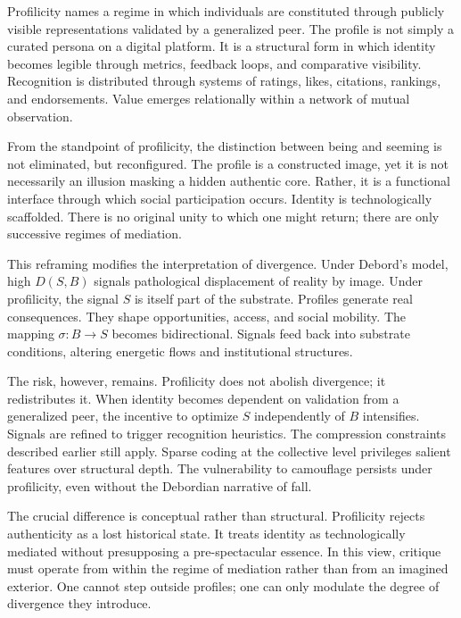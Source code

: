 \documentclass[11pt]{article}
\begin{document}
Profilicity names a regime in which individuals are constituted through publicly visible representations validated by a generalized peer. The profile is not simply a curated persona on a digital platform. It is a structural form in which identity becomes legible through metrics, feedback loops, and comparative visibility. Recognition is distributed through systems of ratings, likes, citations, rankings, and endorsements. Value emerges relationally within a network of mutual observation.

From the standpoint of profilicity, the distinction between being and seeming is not eliminated, but reconfigured. The profile is a constructed image, yet it is not necessarily an illusion masking a hidden authentic core. Rather, it is a functional interface through which social participation occurs. Identity is technologically scaffolded. There is no original unity to which one might return; there are only successive regimes of mediation.

This reframing modifies the interpretation of divergence. Under Debord's model, high $D(S,B)$ signals pathological displacement of reality by image. Under profilicity, the signal $S$ is itself part of the substrate. Profiles generate real consequences. They shape opportunities, access, and social mobility. The mapping $\sigma : B \to S$ becomes bidirectional. Signals feed back into substrate conditions, altering energetic flows and institutional structures.

The risk, however, remains. Profilicity does not abolish divergence; it redistributes it. When identity becomes dependent on validation from a generalized peer, the incentive to optimize $S$ independently of $B$ intensifies. Signals are refined to trigger recognition heuristics. The compression constraints described earlier still apply. Sparse coding at the collective level privileges salient features over structural depth. The vulnerability to camouflage persists under profilicity, even without the Debordian narrative of fall.

The crucial difference is conceptual rather than structural. Profilicity rejects authenticity as a lost historical state. It treats identity as technologically mediated without presupposing a pre-spectacular essence. In this view, critique must operate from within the regime of mediation rather than from an imagined exterior. One cannot step outside profiles; one can only modulate the degree of divergence they introduce.
\end{document}
